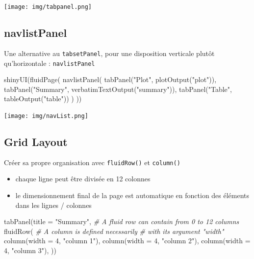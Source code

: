 \documentclass[
]{article}
\newenvironment{Shaded}{\begin{snugshade}}{\end{snugshade}}
\newcommand{\AttributeTok}[1]{\textcolor[rgb]{0.77,0.63,0.00}{#1}}
\newcommand{\CommentTok}[1]{\textcolor[rgb]{0.56,0.35,0.01}{\textit{#1}}}
\newcommand{\DecValTok}[1]{\textcolor[rgb]{0.00,0.00,0.81}{#1}}
\newcommand{\FunctionTok}[1]{\textcolor[rgb]{0.00,0.00,0.00}{#1}}
\newcommand{\NormalTok}[1]{#1}
\newcommand{\StringTok}[1]{\textcolor[rgb]{0.31,0.60,0.02}{#1}}
\providecommand{\tightlist}{%
  \setlength{\itemsep}{0pt}\setlength{\parskip}{0pt}}
\begin{document}
\texttt{[image: img/tabpanel.png]}

\hypertarget{navlistpanel}{%
\subsection{navlistPanel}\label{navlistpanel}}

Une alternative au \texttt{tabsetPanel}, pour une disposition verticale
plutôt qu'horizontale : \texttt{navlistPanel}

\begin{Shaded}
\begin{Highlighting}[]
\FunctionTok{shinyUI}\NormalTok{(}\FunctionTok{fluidPage}\NormalTok{(}
  \FunctionTok{navlistPanel}\NormalTok{(}
    \FunctionTok{tabPanel}\NormalTok{(}\StringTok{"Plot"}\NormalTok{, }\FunctionTok{plotOutput}\NormalTok{(}\StringTok{"plot"}\NormalTok{)), }
    \FunctionTok{tabPanel}\NormalTok{(}\StringTok{"Summary"}\NormalTok{, }\FunctionTok{verbatimTextOutput}\NormalTok{(}\StringTok{"summary"}\NormalTok{)), }
    \FunctionTok{tabPanel}\NormalTok{(}\StringTok{"Table"}\NormalTok{, }\FunctionTok{tableOutput}\NormalTok{(}\StringTok{"table"}\NormalTok{))}
\NormalTok{  )}
\NormalTok{))}
\end{Highlighting}
\end{Shaded}

\texttt{[image: img/navList.png]}

\hypertarget{grid-layout}{%
\subsection{Grid Layout}\label{grid-layout}}

Créer sa propre organisation avec \texttt{fluidRow()} et
\texttt{column()}

\begin{itemize}
\tightlist
\item
  chaque ligne peut être divisée en 12 colonnes
\item
  le dimensionnement final de la page est automatique en fonction des
  éléments dans les lignes / colonnes
\end{itemize}

\begin{Shaded}
\begin{Highlighting}[]
\FunctionTok{tabPanel}\NormalTok{(}\AttributeTok{title =} \StringTok{"Summary"}\NormalTok{,}
         \CommentTok{\# A fluid row can contain from 0 to 12 columns}
         \FunctionTok{fluidRow}\NormalTok{(}
           \CommentTok{\# A column is defined necessarily}
           \CommentTok{\# with its argument "width"}
           \FunctionTok{column}\NormalTok{(}\AttributeTok{width =} \DecValTok{4}\NormalTok{, }\StringTok{"column 1"}\NormalTok{),}
           \FunctionTok{column}\NormalTok{(}\AttributeTok{width =} \DecValTok{4}\NormalTok{, }\StringTok{"column 2"}\NormalTok{),}
           \FunctionTok{column}\NormalTok{(}\AttributeTok{width =} \DecValTok{4}\NormalTok{, }\StringTok{"column 3"}\NormalTok{),}
\NormalTok{         ))}
\end{Highlighting}
\end{Shaded}
\end{document}
